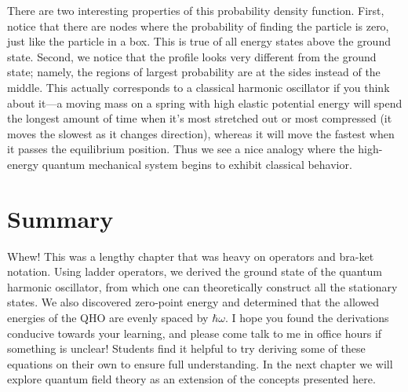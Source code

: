 There are two interesting properties of this probability density function. First, notice that there are nodes where the probability of finding the particle is zero, just like the particle in a box. This is true of all energy states above the ground state. Second, we notice that the profile looks very different from the ground state; namely, the regions of largest probability are at the sides instead of the middle. This actually corresponds to a classical harmonic oscillator if you think about it---a moving mass on a spring with high elastic potential energy will spend the longest amount of time when it's most stretched out or most compressed (it moves the slowest as it changes direction), whereas it will move the fastest when it passes the equilibrium position. Thus we see a nice analogy where the high-energy quantum mechanical system begins to exhibit classical behavior.


\section{Summary}
Whew! This was a lengthy chapter that was heavy on operators and bra-ket notation. Using ladder operators, we derived the ground state of the quantum harmonic oscillator, from which one can theoretically construct all the stationary states. We also discovered zero-point energy and determined that the allowed energies of the QHO are evenly spaced by $\hbar\omega$. I hope you found the derivations conducive towards your learning, and please come talk to me in office hours if something is unclear! Students find it helpful to try deriving some of these equations on their own to ensure full understanding. In the next chapter we will explore quantum field theory as an extension of the concepts presented here.

%